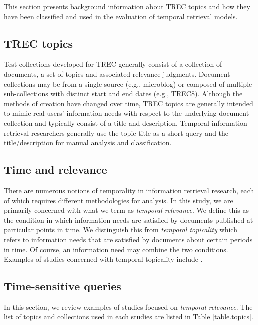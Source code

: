 \documentclass[runningheads,a4paper]{llncs}
\begin{document}
This section presents background information about TREC topics and how they have been classified and used in the evaluation of temporal retrieval models.

\subsection{TREC topics}

Test collections developed for TREC generally consist of a collection of documents, a set of topics and associated relevance judgments. Document collections may be from a single source (e.g., microblog) or composed of multiple sub-collections with distinct start and end dates (e.g., TREC8).  Although the methods of creation have changed over time, TREC topics are generally intended to mimic real users' information needs with respect to the underlying document collection and typically consist of a title and description.  Temporal information retrieval researchers generally use the topic title as a short query and the title/description for manual analysis and classification.

\subsection{Time and relevance}

There are numerous notions of temporality in information retrieval research, each of which requires different methodologies for analysis. In this study, we are primarily concerned with what we term as \emph{temporal relevance}. We define this as the condition in which information needs are satisfied by documents published at particular points in time. We distinguish this from \emph{temporal topicality} which refers to information needs that are satisfied by documents about certain periods in time. Of course, an information need may combine the two conditions. Examples of studies concerned with temporal topicality include \cite{Berberich2010,Kanhabua2011}.

\subsection{Time-sensitive queries}

In this section, we review examples of studies focused on \emph{temporal relevance}.  The list of topics and collections used in each studies are listed in Table \ref{table.topics}. 
\end{document}
